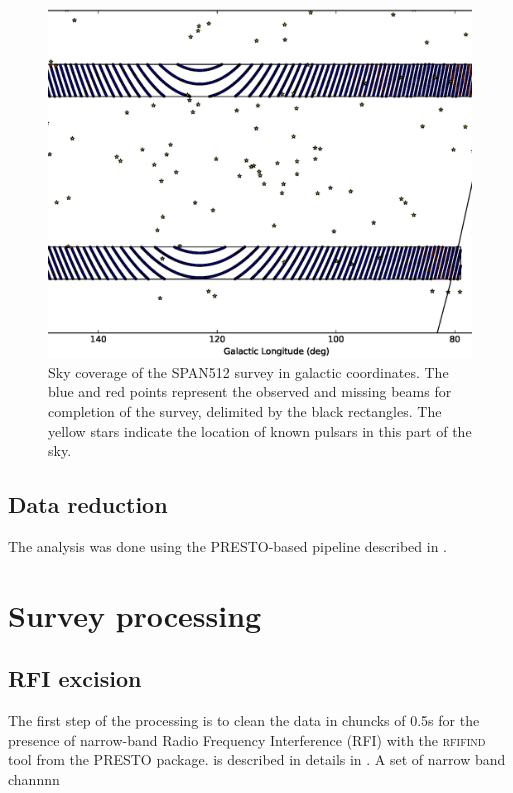 \documentclass[a4paper,fleqn,usenatbib]{mnras}
\begin{document}
\begin{figure}
\includegraphics[width=\textwidth]{plots/sky.ps}
\caption{Sky coverage of the SPAN512 survey in galactic
  coordinates. The blue and red points represent the observed and
  missing beams for completion of the survey, delimited by the black
  rectangles. The yellow stars indicate the location of known pulsars
  in this part of the sky.}
\label{fig:sky}
\end{figure}


\subsection{Data reduction}

The analysis was done using the \textsc{PRESTO}-based pipeline
described in \citet{lbh+15}.


\section{Survey processing}
\label{sec:processing}

\subsection{RFI excision}

The first step of the processing is to clean the data in chuncks of
0.5s for the presence of narrow-band Radio Frequency Interference
(RFI) with the \textsc{rfifind} tool from the \textsc{PRESTO} package.
is described in details in \citet{lbh+15}. A set of narrow band channnn
\end{document}
